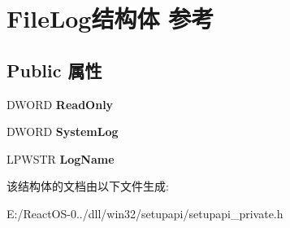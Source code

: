 \hypertarget{struct_file_log}{}\section{File\+Log结构体 参考}
\label{struct_file_log}
\subsection*{Public 属性}
\begin{DoxyCompactItemize}
\item 
\mbox{\label{struct_file_log_a8801b5dcc88d0015069a1b24dbc4970c}} 
D\+W\+O\+RD {\bfseries Read\+Only}
\item 
\mbox{\label{struct_file_log_a8458237121cdfaeb65928cfe1e05b759}} 
D\+W\+O\+RD {\bfseries System\+Log}
\item 
\mbox{\label{struct_file_log_a938d925d24485eb04073358e201fa143}} 
L\+P\+W\+S\+TR {\bfseries Log\+Name}
\end{DoxyCompactItemize}


该结构体的文档由以下文件生成\+:\begin{DoxyCompactItemize}
\item 
E\+:/\+React\+O\+S-\/0../dll/win32/setupapi/setupapi\+\_\+private.\+h\end{DoxyCompactItemize}
